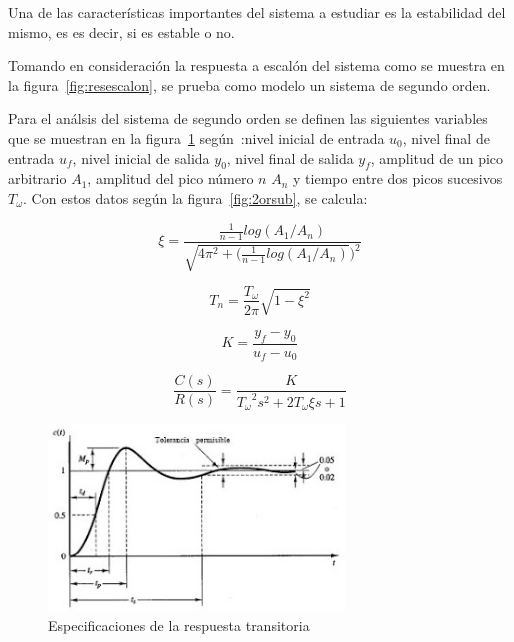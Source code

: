 \documentclass[12pt,twoside,onecolumn]{article}
\begin{document}
Una de las características importantes del sistema a estudiar es la estabilidad del mismo, es es decir, si es estable o no.

Tomando en consideración la respuesta a escalón del sistema como se muestra en la figura~\ref{fig:resescalon}, se prueba como modelo un sistema de segundo orden. 

Para el análsis del sistema de segundo orden se definen las siguientes variables que se muestran en la figura~\ref{fig:2orden} según~\cite{dasdas}:nivel inicial de entrada $u_0$, nivel final de entrada $u_f$, nivel inicial de salida $y_0$, nivel final de salida $y_f$, amplitud de un pico arbitrario $A_1$, amplitud del pico número $n$ $A_n$ y tiempo entre dos picos sucesivos $T_\omega$. Con estos datos según la figura~\ref{fig:2orsub}, se calcula:

\begin{equation} \label{eq:segundoroden}
\xi = \frac{ \frac{1}{n-1}log(A_1/A_n)}{\sqrt{4\pi^2+(\frac{1}{n-1}log(A_1/A_n)})^2}
\end{equation}

\begin{equation} \label{eq:segundoroden}
T_n = \frac{ T_\omega}{2\pi}\sqrt{1-\xi^2}
\end{equation}

\begin{equation} \label{eq:segundoroden}
K = \frac{y_f-y_0}{u_f-u_0}
\end{equation}


\begin{equation} \label{eq:segundoroden}
\frac{C(s)}{R(s) }= \frac{K}{{T_\omega}^2s^2+2{T_\omega}{\xi}s+1}
\end{equation}


\begin{figure}
  \centering
   \includegraphics[width=0.7\textwidth]{figures/2orden}
  \caption{Especificaciones de la respuesta transitoria}
  \label{fig:2orden}
\end{figure}
\end{document}
